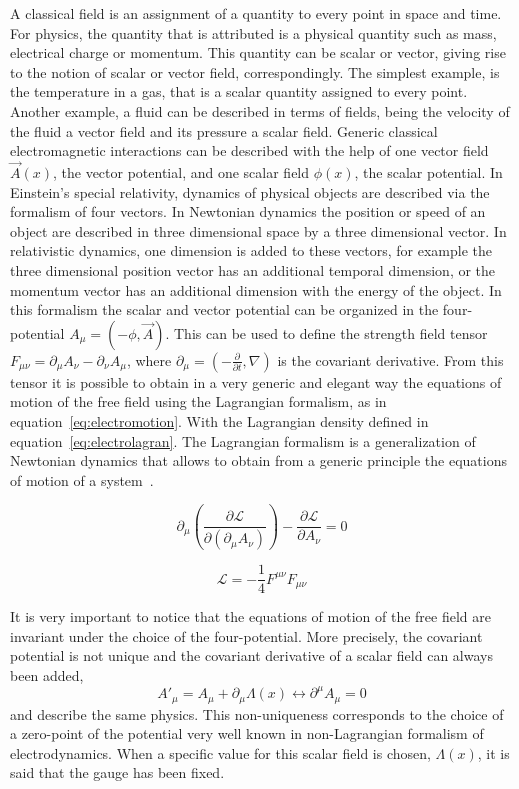 A classical field is an assignment of a quantity to every point in space and time. For physics, the quantity that is attributed is a physical quantity such as mass, electrical charge or momentum. This quantity can be scalar or vector, giving rise to the notion of scalar or vector field, correspondingly. The simplest example, is the temperature in a gas, that is a scalar quantity assigned to every point. Another example, a fluid can be described in terms of fields, being the velocity of the fluid a vector field and its pressure a scalar field. Generic classical electromagnetic interactions can be described with the help of one vector field $\vec{A}(x)$, the vector potential, and one scalar field $\phi(x)$, the scalar potential. In Einstein's special relativity, dynamics of physical objects are described via the formalism of four vectors. In Newtonian dynamics the position or speed of an object are described in three dimensional space by a three dimensional vector. In relativistic dynamics, one dimension is added to these vectors, for example the three dimensional position vector has an additional temporal dimension, or the momentum vector has an additional dimension with the energy of the object. In this formalism the scalar and vector potential can be organized in the four-potential $A_{\mu}=(-\phi,\vec{A})$. This can be used to define the strength field tensor $F_{\mu\nu}=\partial_{\mu}A_{\nu}-\partial_{\nu}A_{\mu}$, where $\partial_{\mu}=\left( -\frac{\partial}{\partial t},\nabla\right)$ is the covariant derivative. From this tensor it is possible to obtain in a very generic and elegant way the equations of motion of the free field using the Lagrangian formalism, as in equation~\ref{eq:electromotion}. With the Lagrangian density defined in equation~\ref{eq:electrolagran}. The Lagrangian formalism is a generalization of Newtonian dynamics that allows to obtain from a generic principle the equations of motion of a system~\cite{Maggiore:2005qv}. 

\begin{equation}
  \label{eq:electromotion}
  \partial_{\mu}\left( \frac{\partial \mathcal{L}}{\partial (\partial_{\mu}A_{\nu})} \right) -\frac{\partial \mathcal{L}}{\partial A_{\nu}}=0
\end{equation}

\begin{equation}
  \label{eq:electrolagran}
  \mathcal{L}=-\frac{1}{4}F^{\mu\nu}F_{\mu\nu}
\end{equation}

It is very important to notice that the equations of motion of the free field are invariant under the choice of the four-potential. More precisely, the covariant potential is not unique and the covariant derivative of a scalar field can always been added, 
\begin{equation}
  \label{eq:gaugeA}
  {A'}_{\mu}=A_{\mu}+\partial_{\mu}\Lambda(x) \leftrightarrow \partial^{\mu}A_{\mu}=0
\end{equation} and describe the same physics. This non-uniqueness corresponds to the choice of a zero-point of the potential very well known in non-Lagrangian formalism of electrodynamics. When a specific value for this scalar field is chosen, $\Lambda(x)$, it is said that the gauge has been fixed. 

